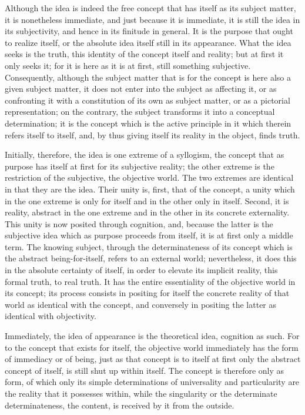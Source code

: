 Although the idea is indeed the free concept
that has itself as its subject matter,
it is nonetheless immediate,
and just because it is immediate,
it is still the idea in its subjectivity,
and hence in its finitude in general.
It is the purpose that ought to realize itself,
or the absolute idea itself still in its appearance.
What the idea seeks is the truth,
this identity of the concept itself and reality;
but at first it only seeks it;
for it is here as it is at first,
still something subjective.
Consequently, although the subject matter
that is for the concept is here also a given subject matter,
it does not enter into the subject as affecting it,
or as confronting it with a constitution of its own
as subject matter, or as a pictorial representation;
on the contrary, the subject transforms it
into a conceptual determination;
it is the concept which is the active principle in it
which therein refers itself to itself,
and, by thus giving itself its reality in the object, finds truth.

Initially, therefore, the idea is one extreme of a syllogism,
the concept that as purpose has itself
at first for its subjective reality;
the other extreme is the restriction
of the subjective, the objective world.
The two extremes are identical in that they are the idea.
Their unity is, first, that of the concept,
a unity which in the one extreme is only for itself
and in the other only in itself.
Second, it is reality, abstract in the one extreme
and in the other in its concrete externality.
This unity is now posited through cognition,
and, because the latter is the subjective idea
which as purpose proceeds from itself,
it is at first only a middle term.
The knowing subject, through the
determinateness of its concept
which is the abstract being-for-itself,
refers to an external world;
nevertheless, it does this in
the absolute certainty of itself,
in order to elevate its implicit reality,
this formal truth, to real truth.
It has the entire essentiality of
the objective world in its concept;
its process consists in positing for itself
the concrete reality of that world
as identical with the concept,
and conversely in positing the latter
as identical with objectivity.

Immediately, the idea of appearance is
the theoretical idea, cognition as such.
For to the concept that exists for itself,
the objective world immediately has
the form of immediacy or of being,
just as that concept is to itself
at first only the abstract concept of itself,
is still shut up within itself.
The concept is therefore only as form,
of which only its simple determinations
of universality and particularity are
the reality that it possesses within,
while the singularity or the determinate determinateness,
the content, is received by it from the outside.

